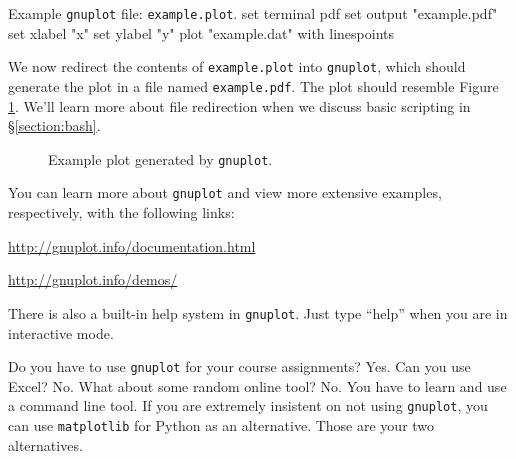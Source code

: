 \begin{pylisting}{Example \texttt{gnuplot} file: \texttt{example.plot}.}
set terminal pdf
set output "example.pdf"
set xlabel "x"
set ylabel "y"
plot "example.dat" with linespoints
\end{pylisting}

We now redirect the contents of \texttt{example.plot} into \texttt{gnuplot},
which should generate the plot in a file named \texttt{example.pdf}. The plot
should resemble Figure \ref{figure:example}. We'll learn more about file
redirection when we discuss basic \Bash{} scripting in \S\ref{section:bash}.


\begin{figure}[bth]
  \centering
  
  \caption{\label{figure:example}
    Example plot generated by \texttt{gnuplot}.
  }
\end{figure}

You can learn more about \texttt{gnuplot} and view more extensive examples,
respectively, with the following links:

\vspace\baselineskip
\centerline{\url{http://gnuplot.info/documentation.html}}
\vspace\baselineskip
\centerline{\url{http://gnuplot.info/demos/}}
\vspace\baselineskip

There is also a built-in help system in \texttt{gnuplot}. Just type
``help'' when you are in interactive mode.

Do you have to use \texttt{gnuplot} for your course assignments? Yes. Can you use Excel? No. What about some random online tool? No. You have to learn and use a
\Unix{} command line tool. If you are extremely insistent on not using
\texttt{gnuplot}, you can use \texttt{matplotlib} for Python as an alternative. Those are your two alternatives.
